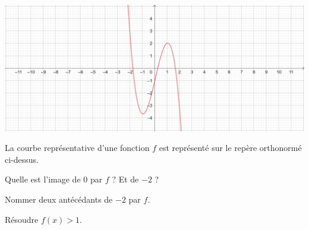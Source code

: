 \documentclass{article}
\begin{document}
\begin{center}
\hrulefill

\vspace*{0.5cm}
\includegraphics[width=\textwidth]{Exercice_7.png}
\end{center}
La courbe représentative d'une fonction $f$ est représenté sur le repère orthonormé ci-dessus.
\begin{enumquestions}
\item Quelle est l'image de $0$ par $f$ ? Et de $-2$ ?
\item Nommer deux antécédants de $-2$ par $f$.
\item Résoudre $f(x) > 1$.
\end{enumquestions}
\end{document}
